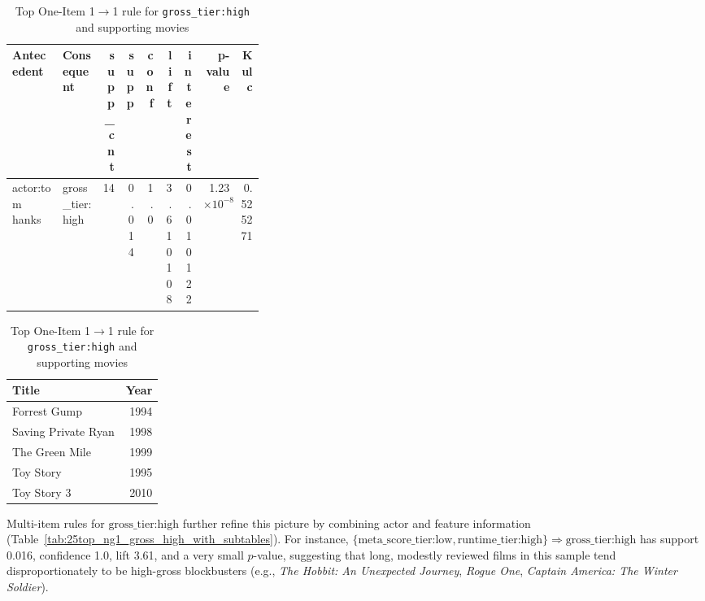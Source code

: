 \documentclass{article}  %
\begin{document}
\begin{table}[!htbp]
    \caption{Top One-Item 1$\rightarrow$1 rule for \texttt{gross\_tier:high} and supporting movies}
    \centering

    \begin{subtable}{\linewidth}
        \centering
        \setlength{\tabcolsep}{2.5pt}
        \renewcommand{\arraystretch}{1.08}
        \begin{adjustbox}{max width=\linewidth}
        \begin{tabular}{p{0.20\linewidth} p{0.16\linewidth} r r r r r r r}
            \toprule
            \textbf{Antecedent} & \textbf{Consequent} &
            \textbf{supp\_cnt} & \textbf{supp} &
            \textbf{conf} & \textbf{lift} &
            \textbf{interest} & \textbf{p-value} & \textbf{Kulc} \\
            \midrule
            actor:tom hanks & gross\_tier:high &
            14 & 0.014 & 1.0 & 3.610108 &
            0.010122 & 1.23$\times 10^{-8}$ & 0.525271 \\
            \bottomrule
        \end{tabular}
        \end{adjustbox}
    \end{subtable}

    \vspace{0.5em}

    \begin{subtable}{\linewidth}
        \centering
        \begin{tabular}{l r}
            \toprule
            \textbf{Title} & \textbf{Year} \\
            \midrule
            Forrest Gump        & 1994 \\
            Saving Private Ryan & 1998 \\
            The Green Mile      & 1999 \\
            Toy Story           & 1995 \\
            Toy Story 3         & 2010 \\
            \bottomrule
        \end{tabular}
    \end{subtable}

    \label{tab:24tom_hanks_gross_high_rule}
\end{table}


Multi-item rules for \(\text{gross\_tier:high}\) further refine this picture by combining actor and feature information (Table~\ref{tab:25top_ng1_gross_high_with_subtables}). For instance, \(\{\text{meta\_score\_tier:low}, \text{runtime\_tier:high}\} \Rightarrow \text{gross\_tier:high}\) has support 0.016, confidence 1.0, lift 3.61, and a very small \(p\)-value, suggesting that long, modestly reviewed films in this sample tend disproportionately to be high-gross blockbusters (e.g., \emph{The Hobbit: An Unexpected Journey}, \emph{Rogue One}, \emph{Captain America: The Winter Soldier}). 
\end{document}
